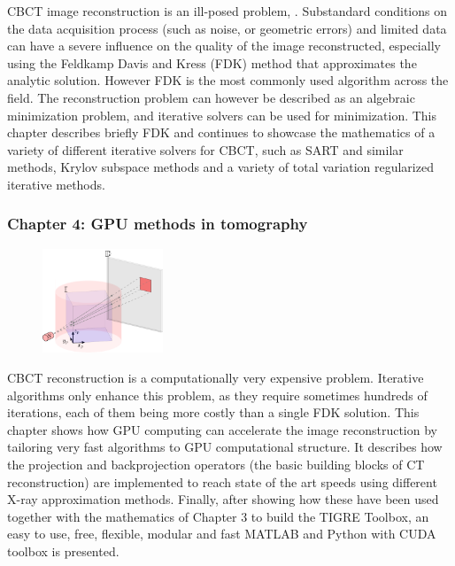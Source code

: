 CBCT image reconstruction is an ill-posed problem, . Substandard conditions on the data acquisition process (such as noise, or geometric errors) and limited data can have a severe influence on the quality of the image reconstructed, especially using the Feldkamp Davis and Kress (FDK) method that approximates the analytic solution. However FDK is the most commonly used algorithm across the field. The reconstruction problem can however be described as an algebraic minimization problem, and iterative solvers can be used for minimization. This chapter describes briefly FDK and continues to showcase the mathematics of a variety of different iterative solvers for CBCT, such as SART and similar methods, Krylov subspace methods and a variety of total variation regularized iterative methods.
\FloatBarrier
\subsubsection{Chapter 4: GPU methods in tomography}



\begin{figure}
\centering
\includegraphics[width=0.32\textwidth]{GPUmethods/projcoord-figure0.pdf}
\end{figure}

CBCT reconstruction is a computationally very expensive problem. Iterative algorithms only enhance this problem, as they require sometimes hundreds of iterations, each of them being more costly than a single FDK solution. This chapter shows how GPU computing can accelerate the image reconstruction by tailoring very fast algorithms to GPU computational structure. It describes how the projection and backprojection operators (the basic building blocks of CT reconstruction) are implemented to reach state of the art speeds using different X-ray approximation methods. Finally, after showing how these have been used together with the mathematics of Chapter 3 to build the TIGRE Toolbox, an easy to use, free, flexible, modular and fast MATLAB and Python with CUDA toolbox is presented. 
\FloatBarrier




